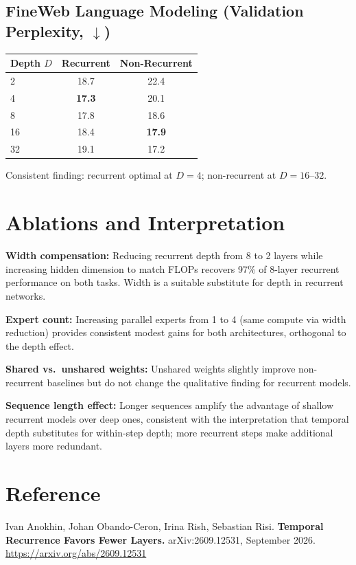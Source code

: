 \documentclass[10pt,twocolumn]{article}
\begin{document}
\subsection*{FineWeb Language Modeling (Validation Perplexity, $\downarrow$)}

\begin{center}
\begin{tabular}{lcc}
\toprule
Depth $D$ & Recurrent & Non-Recurrent \\
\midrule
2  & 18.7 & 22.4 \\
4  & \textbf{17.3} & 20.1 \\
8  & 17.8 & 18.6 \\
16 & 18.4 & \textbf{17.9} \\
32 & 19.1 & 17.2 \\
\bottomrule
\end{tabular}
\end{center}

Consistent finding: recurrent optimal at $D=4$; non-recurrent at
$D=16$--$32$.

\section{Ablations and Interpretation}

\textbf{Width compensation:} Reducing recurrent depth from 8 to 2
layers while increasing hidden dimension to match FLOPs recovers 97\%
of 8-layer recurrent performance on both tasks. Width is a suitable
substitute for depth in recurrent networks.

\textbf{Expert count:} Increasing parallel experts from 1 to 4 (same
compute via width reduction) provides consistent modest gains for both
architectures, orthogonal to the depth effect.

\textbf{Shared vs.\ unshared weights:} Unshared weights slightly
improve non-recurrent baselines but do not change the qualitative
finding for recurrent models.

\textbf{Sequence length effect:} Longer sequences amplify the
advantage of shallow recurrent models over deep ones, consistent with
the interpretation that temporal depth substitutes for within-step
depth; more recurrent steps make additional layers more redundant.

\section*{Reference}

Ivan Anokhin, Johan Obando-Ceron, Irina Rish, Sebastian Risi.
\textbf{Temporal Recurrence Favors Fewer Layers.}
arXiv:2609.12531, September 2026.
\url{https://arxiv.org/abs/2609.12531}
\end{document}
